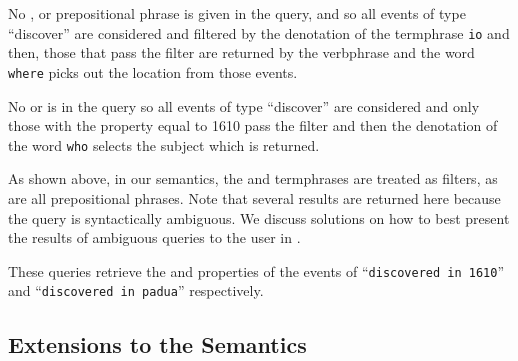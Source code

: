 \documentclass[../main.tex]{subfiles}
\begin{document}
\begin{refsection}
\examplespacing


\examplespacing

\noindent No , or prepositional phrase is given in the query, and so all events of type ``discover'' are considered and filtered by the denotation of the  termphrase \texttt{io} and then, those that pass the filter are returned by the verbphrase and the word \texttt{where} picks out the location from those events. %

\examplespacing


\examplespacing

\noindent No  or  is in the query so all events of type ``discover'' are considered and only those with the  property equal to 1610 pass the filter and then the denotation of the word \texttt{who} selects the subject which is returned.

\examplespacing


\examplespacing

\noindent As shown above, in our semantics, the  and  termphrases are treated as filters, as are all prepositional phrases. Note that several results are returned here because the query is syntactically ambiguous.  We discuss solutions on how to best present the results of ambiguous queries to the user in .

\examplespacing



\noindent These queries retrieve the  and  properties of the events of ``\texttt{discovered in 1610}'' and ``\texttt{discovered in padua}'' respectively.

\subsection{Extensions to the Semantics}
\label{webist2019journal:extend}


\end{refsection}
\end{document}
